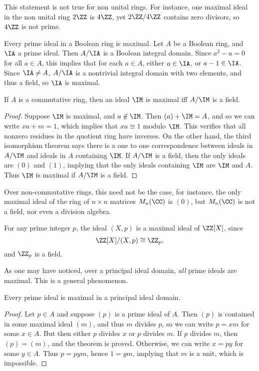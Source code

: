 \begin{remark}
    This statement is not true for non unital rings. For instance, one maximal ideal in the non unital ring $2 \ZZ$ is $4\ZZ$, yet $2\ZZ / 4\ZZ$ contains zero divisors, so $4\ZZ$ is not prime.
\end{remark}

\begin{example}
    Every prime ideal in a Boolean ring is maximal. Let $A$ be a Boolean ring, and $\IA$ a prime ideal. Then $A/\IA$ is a Boolean integral domain. Since $a^2 - a = 0$ for all $a \in A$, this implies that for each $a \in A$, either $a \in \IA$, or $a - 1 \in \IA$. Since $\IA \neq A$, $A/\IA$ is a nontrivial integral domain with two elements, and thus a field, so $\IA$ is maximal.
\end{example}

\begin{theorem}
    If $A$ is a commutative ring, then an ideal $\IM$ is maximal iff $A/\IM$ is a field.
\end{theorem}
\begin{proof}
    Suppose $\IM$ is maximal, and $a \not \in \IM$. Then $(a) + \IM = A$, and so we can write $xa + m = 1$, which implies that $xa \cong 1$ modulo $\IM$. This verifies that all nonzero residues in the quotient ring have inverses. On the other hand, the third isomorphism theorem says there is a one to one correspondence between ideals in $A/\IM$ and ideals in $A$ containing $\IM$. If $A/\IM$ is a field, then the only ideals are $(0)$ and $(1)$, implying that the only ideals containing $\IM$ are $\IM$ and $A$. Thus $\IM$ is maximal if $A/\IM$ is a field.
\end{proof}

Over non-commutative rings, this need not be the case, for instance, the only maximal ideal of the ring of $n \times n$ matrices $M_n(\CC)$ is $(0)$, but $M_n(\CC)$ is not a field, nor even a division algebra.

\begin{example}
    For any prime integer $p$, the ideal $(X,p)$ is a maximal ideal of $\ZZ[X]$, since
    \[ \ZZ[X]/(X,p) \cong \ZZ_p, \]
    and $\ZZ_p$ is a field.
\end{example}

As one may have noticed, over a principal ideal domain, \emph{all} prime ideals are maximal. This is a general phenomenon.

\begin{theorem}
    Every prime ideal is maximal in a principal ideal domain.
\end{theorem}
\begin{proof}
    Let $p \in A$ and suppose $(p)$ is a prime ideal of $A$. Then $(p)$ is contained in some maximal ideal $(m)$, and thus $m$ divides $p$, so we can write $p = xm$ for some $x \in A$. But then either $p$ divides $x$ or $p$ divides $m$. If $p$ divides $m$, then $(p) = (m)$, and the theorem is proved. Otherwise, we can write $x = py$ for some $y \in A$. Thus $p = pym$, hence $1 = ym$, implying that $m$ is a unit, which is impossible.
\end{proof}

